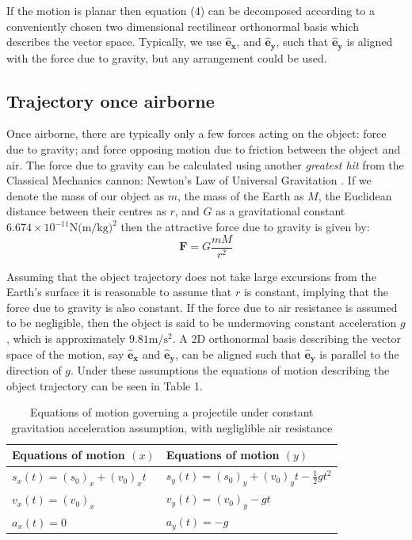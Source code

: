 \documentclass[a4paper]{article}
\begin{document}
If the motion is planar then equation (4) can be decomposed according to a conveniently chosen two dimensional rectilinear orthonormal basis which describes the vector space. Typically, we use $\boldsymbol{\hat{e}_x}$, and $\boldsymbol{\hat{e}_y}$, such that $\boldsymbol{\hat{e}_y}$ is aligned with the force due to gravity, but any arrangement could be used.

\subsection{Trajectory once airborne}
Once airborne, there are typically only a few forces acting on the object: force due to gravity; and force opposing motion due to friction between the object and air. The force due to gravity can be calculated using another \textit{greatest hit} from the Classical Mechanics cannon: Newton's Law of Universal Gravitation \cite{Giancoli:2000}. If we denote the mass of our object as $m$, the mass of the Earth as $M$, the Euclidean distance between their centres as $r$, and $G$ as a gravitational constant $6.674×10^{−11} \si{\newton(\meter\per\kilogram)^2}$ then the attractive force due to gravity is given by:
\begin{equation}
\boldsymbol{F} = G \frac{m M}{r^2}
\end{equation}

Assuming that the object trajectory does not take large excursions from the Earth's surface it is reasonable to assume that $r$ is constant, implying that the force due to gravity is also constant. If the force due to air resistance is assumed to be negligible, then the object is said to be undermoving constant acceleration $g$, which is approximately $9.81\si{\meter\per\second^2}$. A 2D orthonormal basis describing the vector space of the motion, say $\boldsymbol{\hat{e}_x}$ and $\boldsymbol{\hat{e}_y}$, can be aligned such that $\boldsymbol{\hat{e}_y}$ is parallel to the direction of $g$. Under these assumptions the equations of motion describing the object trajectory \cite{Giancoli:2000} can be seen in Table 1.
\begin{table}[h]
	\centering
	\caption{Equations of motion governing a projectile under constant gravitation acceleration assumption, with negliglible air resistance}
	\begin{tabular}{ll}
		\toprule
		Equations of motion $(x)$ & Equations of motion $(y)$\\
		\midrule
		$s_x(t) = (s_0)_x + (v_0)_x t$ & $s_y(t) = (s_0)_y + (v_0)_y t -\frac{1}{2}gt^2 $ \\
		$v_x(t) = (v_0)_x$ & $v_y(t) = (v_0)_y - gt$ \\
		$a_x(t) = 0$ & $a_y(t) = -g$ \\
		\bottomrule
	\end{tabular}
\end{table}
\end{document}

